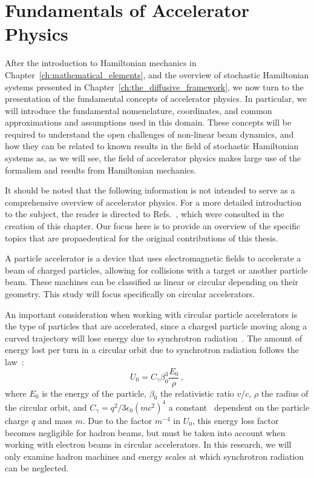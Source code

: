 
\chapter{Fundamentals of Accelerator Physics}\label{ch:accelerator_physics_fundamentals}

After the introduction to Hamiltonian mechanics in Chapter~\ref{ch:mathematical_elements}, and the overview of stochastic Hamiltonian systems presented in Chapter~\ref{ch:the_diffusive_framework}, we now turn to the presentation of the fundamental concepts of accelerator physics. In particular, we will introduce the fundamental nomenclature, coordinates, and common approximations and assumptions used in this domain. These concepts will be required to understand the open challenges of non-linear beam dynamics, and how they can be related to known results in the field of stochastic Hamiltonian systems as, as we will see, the field of accelerator physics makes large use of the formalism and results from Hamiltonian mechanics.

It should be noted that the following information is not intended to serve as a comprehensive overview of accelerator physics. For a more detailed introduction to the subject, the reader is directed to Refs.~\cite{Lee:2651939,wiedemann2015particle}, which were consulted in the creation of this chapter. Our focus here is to provide an overview of the specific topics that are propaedeutical for the original contributions of this thesis. 

A particle accelerator is a device that uses electromagnetic fields to accelerate a beam of charged particles, allowing for collisions with a target or another particle beam. These machines can be classified as linear or circular depending on their geometry. This study will focus specifically on circular accelerators.

An important consideration when working with circular particle accelerators is the type of particles that are accelerated, since a charged particle moving along a curved trajectory will lose energy due to synchrotron radiation~\cite{jackson1999classical}. The amount of energy lost per turn in a circular orbit due to synchrotron radiation follows the law~\cite{doi:10.1142/p899}:
\begin{equation}
    U_0 = C_\gamma \beta_0^3\frac{E_0}{\rho}\,,
\end{equation}
where $E_0$ is the energy of the particle, $\beta_0$ the relativistic ratio $v/c$, $\rho$ the radius of the circular orbit, and $C_\gamma = q^2 / 3\epsilon_0(mc^2)^4$ a constant~\cite{sands1970physics} dependent on the particle charge $q$ and mass $m$. Due to the factor $m^{-4}$ in $U_0$, this energy loss factor becomes negligible for hadron beams, but must be taken into account when working with electron beams in circular accelerators. In this research, we will only examine hadron machines and energy scales at which synchrotron radiation can be neglected.

